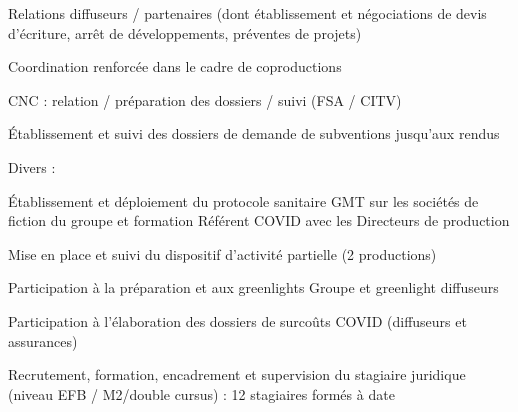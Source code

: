 \begin{cventries}
{\begin{cvitems}
\begin{cvsubitems}
\begin{cvsubsubitems}
          \end{cvsubsubitems}
          \item {Relations diffuseurs / partenaires (dont établissement et négociations de devis d’écriture, arrêt de développements, préventes de projets)}
          \item {Coordination renforcée dans le cadre de coproductions}
          \item {CNC : relation / préparation des dossiers / suivi (FSA / CITV)}
          \item {Établissement et suivi des dossiers de demande de subventions jusqu’aux rendus}
        \end{cvsubitems}
        \item {Divers :}
        \begin{cvsubitems}
          \item {Établissement et déploiement du protocole sanitaire GMT sur les sociétés de fiction du groupe et formation Référent COVID avec les \newline Directeurs de production}
          \item {Mise en place et suivi du dispositif d’activité partielle (2 productions)}
          \item {Participation à la préparation et aux greenlights Groupe et greenlight diffuseurs}
          \item {Participation à l’élaboration des dossiers de surcoûts COVID (diffuseurs et assurances)}
          \item {Recrutement, formation, encadrement et supervision du stagiaire juridique (niveau EFB / M2/double cursus) : 12 stagiaires formés à date}
        \end{cvsubitems}
      \end{cvitems}
    }


\end{cventries}
